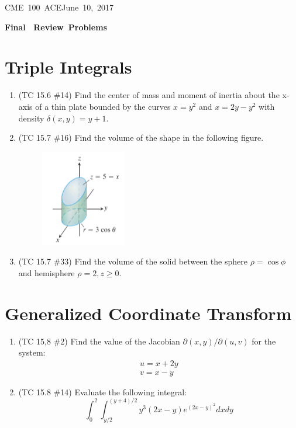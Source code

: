 \documentclass[letterpaper, 11pt]{article}
\makeatletter
\newcommand{\hmwkTitle}{Final \ Review\ Problems} %
\newcommand{\hmwkClass}{CME\ 100\ ACE} %
\newcommand{\hmwkAuthorName}{T Anderson} %
\newcommand{\hmwkAuthorEmail}{timmya@stanford.edu} %
\makeatother
\begin{document}
\noindent
\normalsize 
\hmwkClass \hfill June\ 10,\ 2017\\

\begin{center} \Large \textbf{\hmwkTitle} \end{center}

\section{Triple Integrals}
\begin{enumerate}
\item (TC 15.6 \#14) Find the center of mass and moment of inertia about the x-axis of a thin plate bounded by the curves $x = y^2$ and $x = 2y - y^2$ with density $\delta(x,y) = y + 1$.


\item (TC 15.7 \#16) Find the volume of the shape in the following figure. 
\begin{figure}[H]
\centering \includegraphics[width=0.15\columnwidth]{finalReviewImgs/TC157_16.png}
\end{figure}



\item (TC 15.7 \#33) Find the volume of the solid between the sphere $\rho = \cos \phi$ and hemisphere $\rho = 2, z \geq 0$. 

\end{enumerate}

\section{Generalized Coordinate Transform}
\begin{enumerate}
\item (TC 15,8 \#2) Find the value of the Jacobian $\partial(x,y)/\partial (u,v)$ for the system:
\begin{gather*}
u = x + 2y \\
v = x - y
\end{gather*}


\item (TC 15.8 \#14) Evaluate the following integral:
\[ \int_0^2 \int_{y/2}^{(y+4)/2} y^3 (2x - y )e^{(2x - y)^2} dx dy \]


\end{enumerate}
\end{document}
